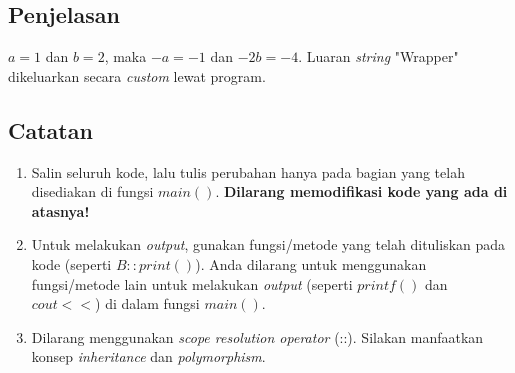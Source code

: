 \documentclass{article}
\begin{document}
\subsection*{Penjelasan}

\(a = 1\) dan \(b = 2\), maka \(-a = -1\) dan \(-2b = -4\). Luaran \textit{string} "Wrapper" dikeluarkan secara \textit{custom} lewat program.

\subsection*{Catatan}

\begin{enumerate}
    \item Salin seluruh kode, lalu tulis perubahan hanya pada bagian yang telah disediakan di fungsi \(main()\). \textbf{Dilarang memodifikasi kode yang ada di atasnya!}
    \item Untuk melakukan \textit{output}, gunakan fungsi/metode yang telah dituliskan pada kode (seperti \(B::print()\)). Anda dilarang untuk menggunakan fungsi/metode lain untuk melakukan \textit{output} (seperti \(printf()\) dan \(cout <<\)) di dalam fungsi \(main()\). 
    \item Dilarang menggunakan \textit{scope resolution operator} (::). Silakan manfaatkan konsep \textit{inheritance} dan \textit{polymorphism}.
\end{enumerate}
\end{document}
